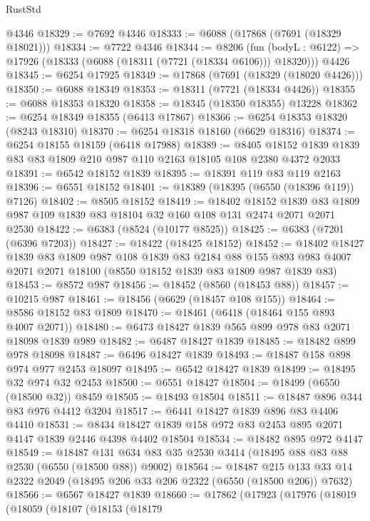\begin{lexlean}{RustStd}
\begin{coremodule}
    @4346
@18329 := @7692 @4346
@18333 := @6088 (@17868 (@7691 (@18329 @18021)))
@18334 := @7722 @4346
@18344 := @8206
    (fun (bodyL : @6122) => @17926 (@18333 (@6088 (@18311 (@7721 (@18334 @6106))) @18320)))
    @4426
@18345 := @6254 @17925
@18349 := @17868 (@7691 (@18329 (@18020 @4426)))
@18350 := @6088 @18349
@18353 := @18311 (@7721 (@18334 @4426))
@18355 := @6088 @18353 @18320
@18358 := @18345 (@18350 @18355) @13228
@18362 := @6254 @18349 @18355 (@6413 @17867)
@18366 := @6254 @18353 @18320 (@8243 @18310)
@18370 := @6254 @18318 @18160 (@6629 @18316)
@18374 := @6254 @18155 @18159 (@6418 @17988)
@18389 := @8405 @18152 @1839 @1839 @83 @83 @1809 @210 @987 @110 @2163 @18105 @108 @2380 @4372 @2033
@18391 := @6542 @18152 @1839
@18395 := @18391 @119 @83 @119 @2163
@18396 := @6551 @18152
@18401 := @18389 (@18395 (@6550 (@18396 @119)) @7126)
@18402 := @8505 @18152
@18419 := @18402
    @18152
    @1839
    @83
    @1809
    @987
    @109
    @1839
    @83
    @18104
    @32
    @160
    @108
    @131
    @2474
    @2071
    @2071
    @2530
@18422 := @6383 (@8524 (@10177 @8525))
@18425 := @6383 (@7201 (@6396 @7203))
@18427 := @18422 (@18425 @18152)
@18452 := @18402
    @18427
    @1839
    @83
    @1809
    @987
    @108
    @1839
    @83
    @2184
    @88
    @155
    @893
    @983
    @4007
    @2071
    @2071
    @18100
    (@8550 @18152 @1839 @83 @1809 @987 @1839 @83)
@18453 := @8572 @987
@18456 := @18452 (@8560 (@18453 @88))
@18457 := @10215 @987
@18461 := @18456 (@6629 (@18457 @108 @155))
@18464 := @8586 @18152 @83 @1809
@18470 := @18461 (@6418 (@18464 @155 @893 @4007 @2071))
@18480 := @6473 @18427 @1839 @565 @899 @978 @83 @2071 @18098 @1839 @989
@18482 := @6487 @18427 @1839
@18485 := @18482 @899 @978 @18098
@18487 := @6496 @18427 @1839
@18493 := @18487 @158 @898 @974 @977 @2453 @18097
@18495 := @6542 @18427 @1839
@18499 := @18495 @32 @974 @32 @2453
@18500 := @6551 @18427
@18504 := @18499 (@6550 (@18500 @32)) @8459
@18505 := @18493 @18504
@18511 := @18487 @896 @344 @83 @976 @4412 @3204
@18517 := @6441 @18427 @1839 @896 @83 @4406 @4410
@18531 := @8434 @18427 @1839 @158 @972 @83 @2453 @895 @2071 @4147 @1839 @2446 @4398 @4402 @18504
@18534 := @18482 @895 @972 @4147
@18549 := @18487 @131 @634 @83 @35 @2530 @3414 (@18495 @88 @83 @88 @2530 (@6550 (@18500 @88)) @9002)
@18564 := @18487
    @215
    @133
    @33
    @14
    @2322
    @2049
    (@18495 @206 @33 @206 @2322 (@6550 (@18500 @206)) @7632)
@18566 := @6567 @18427 @1839
@18660 := @17862
    (@17923
      (@17976
        (@18019
          (@18059
            (@18107
              (@18153
                (@18179

\end{coremodule}
\end{lexlean}
